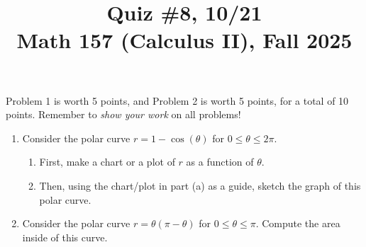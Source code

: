 \documentclass[11pt]{article}
\title{Quiz \#8, 10/21\\ Math 157 (Calculus II), Fall 2025}
\date{}
\begin{document}
\maketitle

\thispagestyle{empty}

\vspace{-2cm}

Problem 1 is worth 5 points, and Problem 2 is worth 5 points, for a total of 10 points. Remember to \emph{show your work} on all problems!

\begin{enumerate}
\item Consider the polar curve $r=1-\cos(\theta)$ for $0 \leq \theta \leq 2\pi$.
\begin{enumerate}
\item First, make a chart or a plot of $r$ as a function of $\theta$.
\item Then, using the chart/plot in part (a) as a guide, sketch the graph of this polar curve.
\end{enumerate}

\vspace{3.25in}

\item Consider the polar curve $r=\theta(\pi-\theta)$ for $0 \leq \theta \leq \pi$. Compute the area inside of this curve.

\end{enumerate}
\end{document}
